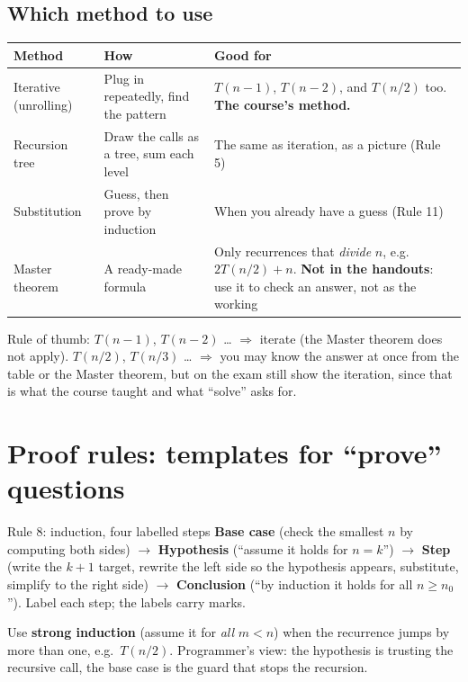 \documentclass{fkt-notes}
\begin{document}
\subsection{Which method to use}
\begin{center}
\small
\begin{tabular}{@{}p{3.2cm}p{5.2cm}p{5.8cm}@{}}
\toprule
Method & How & Good for \\
\midrule
Iterative (unrolling) & Plug in repeatedly, find the pattern & $T(n-1)$, $T(n-2)$, and $T(n/2)$ too. \textbf{The course's method.} \\
Recursion tree & Draw the calls as a tree, sum each level & The same as iteration, as a picture (Rule 5) \\
Substitution & Guess, then prove by induction & When you already have a guess (Rule 11) \\
Master theorem & A ready-made formula & Only recurrences that \emph{divide} $n$, e.g.\ $2T(n/2)+n$. \textbf{Not in the handouts}: use it to check an answer, not as the working \\
\bottomrule
\end{tabular}
\end{center}
Rule of thumb: $T(n-1)$, $T(n-2)$ \dots{} $\Rightarrow$ iterate (the Master theorem does not apply). $T(n/2)$, $T(n/3)$ \dots{} $\Rightarrow$ you may know the answer at once from the table or the Master theorem, but on the exam still show the iteration, since that is what the course taught and what ``solve'' asks for.

\section{Proof rules: templates for ``prove'' questions}
\label{sec:proofs}

\begin{rulebox}{Rule 8: induction, four labelled steps}
\textbf{Base case} (check the smallest $n$ by computing both sides) $\to$ \textbf{Hypothesis} (``assume it holds for $n=k$'') $\to$ \textbf{Step} (write the $k+1$ target, rewrite the left side so the hypothesis appears, substitute, simplify to the right side) $\to$ \textbf{Conclusion} (``by induction it holds for all $n\ge n_0$''). Label each step; the labels carry marks.
\end{rulebox}
Use \textbf{strong induction} (assume it for \emph{all} $m<n$) when the recurrence jumps by more than one, e.g.\ $T(n/2)$. Programmer's view: the hypothesis is trusting the recursive call, the base case is the guard that stops the recursion.
\end{document}
